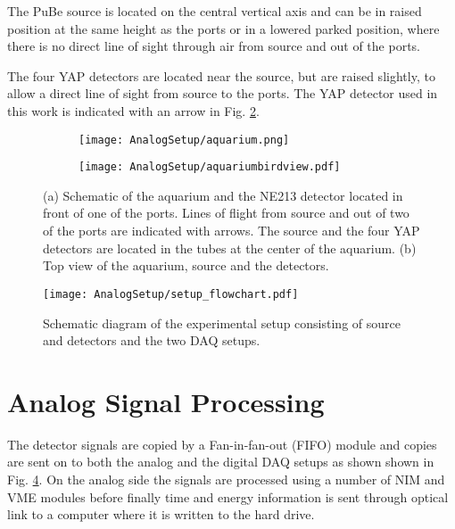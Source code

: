 \documentclass[main.tex]{subfiles}
\begin{document}
The PuBe source is located on the central vertical axis and can be in raised position at the same height as the ports or in a lowered parked position, where there is no direct line of sight through air from source and out of the ports.

The four YAP detectors are located near the source, but are raised slightly, to allow a direct line of sight from source to the ports. The YAP detector used in this work is indicated with an arrow in Fig. \ref{fig:aquarium_bird}.
\begin{figure}[ht]
	\center
	\begin{subfigure}[b]{0.39\textwidth}
	    \centering
    	    \texttt{[image: AnalogSetup/aquarium.png]}
        	\caption[Aquarium 3D]{}
	    \label{fig:aquarium_pers} 
	\end{subfigure}
	\begin{subfigure}[b]{0.6\textwidth}
	    \centering
    	    \texttt{[image: AnalogSetup/aquariumbirdview.pdf]}
        	\caption[Aquarium 2D, top view]{}
	    \label{fig:aquarium_bird} 
	\end{subfigure}
	\caption[CAD drawing of the aquarium]{(a) Schematic of the aquarium and the NE213 detector located in front of one of the ports. Lines of flight from source and out of two of the ports are indicated with arrows. The source and the four YAP detectors are located in the tubes at the center of the aquarium. (b) Top view of the aquarium, source and the detectors.}
	\label{fig:aquarium}
\end{figure}
\begin{figure}[h]
    \centering
        \texttt{[image: AnalogSetup/setup\_flowchart.pdf]}
        \caption[Diagram of experimental setup]{Schematic diagram of the experimental setup consisting of source and detectors and the two DAQ setups.}
    \label{fig:setup}
\end{figure}

\section{Analog Signal Processing}
The detector signals are copied by a Fan-in-fan-out (FIFO) module and copies are sent on to both the analog and the digital DAQ setups as shown shown in Fig. \ref{fig:setup}. On the analog side the signals are processed using a number of NIM and VME modules before finally time and energy information is sent through optical link to a computer where it is written to the hard drive. 
\end{document}
